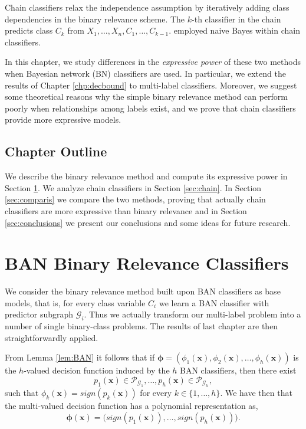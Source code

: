 \documentclass[11pt,a4paper, twoside]{book}
\begin{document}
Chain classifiers \citep{reed2009,icml2010_037} relax the independence assumption by iteratively adding class dependencies in the binary relevance scheme. The $k$-th classifier in the chain predicts class $C_k$ from $X_1,\ldots,X_n,C_1,\ldots,C_{k-1}$. \cite{sucar2014} employed naive Bayes within chain classifiers. 

In this chapter, we study differences in the \textit{expressive power} of these two methods when Bayesian network (BN) classifiers \citep{bielza2014} are used. 
In particular, we extend the results of Chapter \ref{chp:decbound} to multi-label classifiers. Moreover, we suggest some theoretical reasons why the simple binary relevance method can perform poorly when relationships among labels exist, and we prove that chain classifiers provide more expressive models. 


\subsection{Chapter Outline}
We describe the binary relevance method and compute its expressive power in Section \ref{sec:binary-relevance}. We analyze chain classifiers in Section \ref{sec:chain}. In Section \ref{sec:comparis} we compare the two methods, proving that actually chain classifiers are more expressive than binary relevance and  in Section \ref{sec:conclusions} we present our conclusions and some ideas for future research. 

\section{BAN Binary Relevance Classifiers}
\label{sec:binary-relevance}
We consider the binary relevance method built upon BAN classifiers as base models, that is, 
for every class variable $C_i$ we learn a BAN classifier with predictor subgraph $\mathcal{G}_i$. 
Thus we actually transform our multi-label problem into a number of single binary-class problems. The results of last chapter are then straightforwardly applied. 

From Lemma \ref{lem:BAN} it follows that if $\bm{\phi}=(\phi_1(\mathbf{x}),\phi_2(\mathbf{x}),\ldots,\phi_{h}(\mathbf{x}))$ is the $h$-valued decision function induced by the $h$ BAN classifiers, then there exist $$p_1(\mathbf{x})\in \mathcal{P}_{\mathcal{G}_1} ,\ldots,p_{h}(\mathbf{x}) \in \mathcal{P}_{\mathcal{G}_h},$$
such that $\phi_k(\mathbf{x})=sign(p_k(\mathbf{x}))$ for every $k \in \{1,\ldots,h\}$. We have then that the multi-valued decision function has a polynomial representation as,
$$ {\bm{\phi} }(\mathbf{x})=\big( sign(p_1(\mathbf{x})),\ldots,sign(p_h(\mathbf{x})) \big). $$
\end{document}
